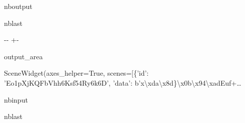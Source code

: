 \documentclass[letterpaper,10pt,english]{sphinxmanual}
\begin{document}
\begin{sphinxuseclass}{nboutput}
\begin{sphinxuseclass}{nblast}
{

\kern-\sphinxverbatimsmallskipamount\kern-\baselineskip
\kern+\FrameHeightAdjust\kern-\fboxrule
\vspace{\nbsphinxcodecellspacing}

\begin{sphinxuseclass}{output_area}
\begin{sphinxuseclass}{}


\begin{sphinxVerbatim}[commandchars=\\\{\}]
\llap{\color{nbsphinxout}[16]:\,\hspace{\fboxrule}\hspace{\fboxsep}}SceneWidget(axes\_helper=True, scenes=[\{'id': 'Eo1pXjKQFbVhh6Ksf54Ry6k6D', 'data': b'x\textbackslash{}xda\textbackslash{}x8d\}\textbackslash{}x0b\textbackslash{}x94\textbackslash{}xadEuf+…
\end{sphinxVerbatim}



\end{sphinxuseclass}
\end{sphinxuseclass}
}

\end{sphinxuseclass}
\end{sphinxuseclass}
\begin{sphinxuseclass}{nbinput}
\begin{sphinxuseclass}{nblast}
{
\begin{sphinxVerbatim}[commandchars=\\\{\}]
\llap{\color{nbsphinxin}[17]:\,\hspace{\fboxrule}\hspace{\fboxsep}} 

  \PYG{p}{[}\PYG{p}{]}  

   
    \PYG{p}{[}\PYG{p}{]}\PYG{p}{[}\PYG{p}{]}\PYG{p}{[}\PYG{p}{]}\PYG{p}{[}\PYG{p}{]}  
\end{sphinxVerbatim}
}

\end{sphinxuseclass}
\end{sphinxuseclass}
\end{document}
